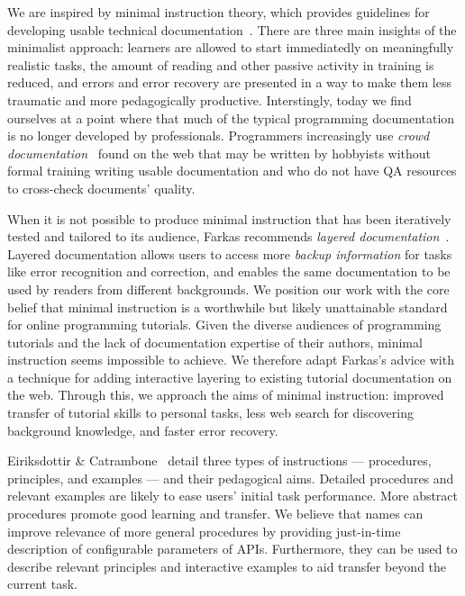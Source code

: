 We are inspired by minimal instruction theory, which provides guidelines for developing usable technical documentation~\cite{carroll_nurnberg_1990}.
There are three main insights of the minimalist approach:
learners are allowed to start immediatedly on meaningfully realistic tasks,
the amount of reading and other passive activity in training is reduced,
and errors and error recovery are presented in a way to make them less traumatic and more pedagogically productive.
Interstingly, today we find ourselves at a point where that much of the typical programming documentation is no longer developed by professionals.
Programmers increasingly use \emph{crowd documentation}~\cite{parnin_measuring_2011} found on the web that may be written by hobbyists without formal training writing usable documentation and who do not have QA resources to cross-check documents' quality.

When it is not possible to produce minimal instruction that has been iteratively tested and tailored to its audience, Farkas recommends \emph{layered documentation}~\cite{farkas_layering_1998}.
Layered documentation allows users to access more \emph{backup information} for tasks like error recognition and correction, and enables the same documentation to be used by readers from different backgrounds.
We position our work with the core belief that minimal instruction is a worthwhile but likely unattainable standard for online programming tutorials.
Given the diverse audiences of programming tutorials and the lack of documentation expertise of their authors, minimal instruction seems impossible to achieve.
We therefore adapt Farkas's advice with a technique for adding interactive layering to existing tutorial documentation on the web.
Through this, we approach the aims of minimal instruction: improved transfer of tutorial skills to personal tasks, less web search for discovering background knowledge, and faster error recovery.

Eiriksdottir \& Catrambone~\cite{eiriksdottir_procedural_2011} detail three types of instructions --- procedures, principles, and examples --- and their pedagogical aims.
Detailed procedures and relevant examples are likely to ease users' initial task performance.
More abstract procedures promote good learning and transfer.
We believe that \glspl{name} can improve relevance of more general procedures by providing just-in-time description of configurable parameters of APIs.
Furthermore, they can be used to describe relevant principles and interactive examples to aid transfer beyond the current task.

